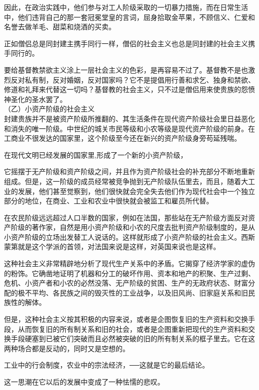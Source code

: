 \documentclass[UTF8]{ctexart}
\begin{document}
因此，在政治实践中，他们参与对工人阶级采取的一切暴力措施，而在日常生活中，他们违背自己的那一套冠冕堂皇的言词，屈身拾取金苹果，不顾信义、仁爱和名誉去做羊毛、甜菜和烧酒的买卖。

正如僧侣总是同封建主携手同行一样，僧侣的社会主义也总是同封建的社会主义携手同行的。

要给基督教禁欲主义涂上一层社会主义的色彩，是再容易不过了。基督教不是也激烈反对私有制，反对婚姻，反对国家吗？它不是提倡用行善和求乞、独身和禁欲、修道和礼拜来代替这一切吗？基督教的社会主义，只不过是僧侣用来使贵族的怨愤神圣化的圣水罢了。
\\

（乙）小资产阶级的社会主义
\\

封建贵族并不是被资产阶级所推翻的、其生活条件在现代资产阶级社会里日益恶化和消失的唯一阶级。中世纪的城关市民等级和小农等级是现代资产阶级的前身。在工商业不很发达的国家里，这个阶级至今还在新兴的资产阶级身旁苟延残喘。

在现代文明已经发展的国家里,形成了一个新的小资产阶级，

它摇摆于无产阶级和资产阶级之间，并且作为资产阶级社会的补充部分不断地重新组成。但是，这一阶级的成员经常被竞争抛到无产阶级队伍里去，而且，随着大工业的发展，他们甚至觉察到，他们很快就会完全失去他们作为现代社会中一个独立部分的地位，在商业、工业和农业中很快就会被监工和雇员所代替。

在农民阶级远远超过人口半数的国家，例如在法国，那些站在无产阶级方面反对资产阶级的著作家，自然是用小资产阶级和小农的尺度去批判资产阶级制度的，是从小资产阶级的立场出发替工人说话的。这样就形成了小资产阶级的社会主义。西斯蒙第就是这个学派的首领，对法国来说是这样，对英国来说也是这样。

这种社会主义非常精辟地分析了现代生产关系中的矛盾。它揭穿了经济学家的虚伪的粉饰。它确凿地证明了机器和分工的破坏作用、资本和地产的积聚、生产过剩、危机、小资产者和小农的必然没落、无产阶级的贫困、生产的无政府状态、财富分配的极不平均、各民族之间的毁灭性的工业战争，以及旧风尚、旧家庭关系和旧民族性的解体。

但是，这种社会主义按其积极的内容来说，或者是企图恢复旧的生产资料和交换手段，从而恢复旧的所有制关系和旧的社会，或者是企图重新把现代的生产资料和交换手段硬塞到已被它们突破而且必然被突破的旧的所有制关系的框子里去。它在这两种场合都是反动的，同时又是空想的。

工业中的行会制度，农业中的宗法经济，──这就是它的最后结论。

这一思潮在它以后的发展中变成了一种怯懦的悲叹。
\\
\end{document}
